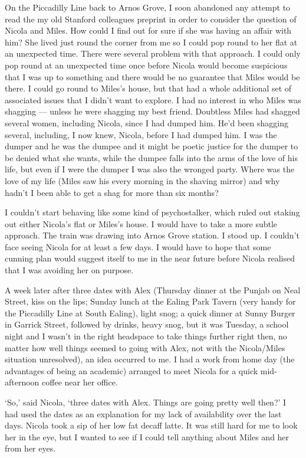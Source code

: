 On the Piccadilly Line back to Arnos Grove, I soon abandoned any attempt to read the my old Stanford colleagues preprint in order to consider the question of Nicola and Miles. How could I find out for sure if she was having an affair with him? She lived just round the corner from me so I
could pop round to her flat at an unexpected time. There were several problem with
that approach. I could only pop round at an unexpected time once before Nicola would
become suspicious that I was up to something and there would be
no guarantee that Miles would be there. I could go round to
Miles's house, but that had a whole additional set of associated issues that I
didn't want to explore. I had no interest in who Miles was shagging
--- unless he were shagging my best friend. Doubtless Miles had shagged several women, including Nicola, since I had dumped him. He'd been shagging several, including, I now knew, Nicola, before I had dumped him. I was the dumper and he was the dumpee and it might be poetic justice for the dumper to be denied what she wants,
while the dumpee falls into the arms of the love of his life, but even if I were the dumper I was also the wronged party. Where was the love of {\twelveit my\/} life (Miles saw his every morning in the shaving mirror) and why hadn't I been able to get a shag for more than six months?

I couldn't start behaving like some kind of psychostalker, which ruled out staking out either Nicola's flat or Miles's house. I would have to take a more subtle approach. The train was drawing into Arnos Grove station. I stood up. I couldn't face seeing Nicola for at least a few days. I would have to hope that some cunning plan would suggest itself to me in the near future before Nicola realised that I was avoiding her on purpose.

A week later after three dates with Alex (Thursday dinner at the Punjab on Neal Street, kiss on the lips; Sunday lunch at the Ealing Park Tavern (very handy for the Piccadilly Line at South Ealing), light snog; a quick dinner at Sunny Burger in Garrick Street, followed by drinks, heavy snog, but it was Tuesday, a school night and I wasn't in the right headspace to take things further right then, no matter how well things seemed to going with Alex, not with the Nicola/Miles situation unresolved), an idea occurred to me. I had a work from home day (the advantages of being an academic) arranged to meet Nicola for a quick mid-afternoon coffee near her office.

`So,' said Nicola, `three dates with Alex. Things are going pretty well then?' I had used the dates as an explanation for my lack of availability over the last days. Nicola took a sip of her low fat decaff latte. It was still hard for me to look her in the eye, but I wanted to see if I could tell anything about Miles and her from her eyes.

